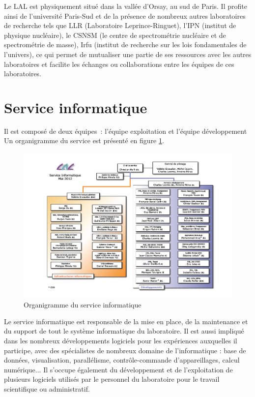 \documentclass[12pt,a4paper,twoside]{report}
\begin{document}
Le LAL est physiquement situé dans la vallée d’Orsay, au sud de Paris. Il profite
ainsi de l’université Paris-Sud et de la présence de nombreux autres
laboratoires de recherche tels que LLR (Laboratoire Leprince-Ringuet), l’IPN
(institut de physique nucléaire), le CSNSM (le centre de spectrométrie
nucléaire et de spectrométrie de masse), Irfu (institut de recherche sur les
lois fondamentales de l’univers), ce qui permet de mutualiser une partie de ses
ressources avec les autres laboratoires et facilite les échanges ou
collaborations entre les équipes de ces laboratoires.

\section{Service informatique}

Il est composé de deux équipes~: l’équipe exploitation et l’équipe
développement Un organigramme du service est présenté en figure
\ref{fig:siorga}.\\

\begin{figure}[hbt]
	\hspace{-3.5cm}
	\includegraphics[scale=0.7]{img/si_organigramme}
	\caption{Organigramme du service informatique}
	\label{fig:siorga}
\end{figure}

Le service informatique est responsable de la mise en place, de la maintenance
et du support de tout le système informatique du laboratoire. Il est aussi impliqué dans 
les nombreux développements logiciels pour les expériences auxquelles il participe, avec
des spécialistes de nombreux domaine de l'informatique : base de données, visualisation,
parallélisme, contrôle-commande d'appareillages, calcul numérique... Il s’occupe
également du développement et de l’exploitation de plusieurs logiciels utilisés
par le personnel du laboratoire pour le travail scientifique ou administratif.
\end{document}
